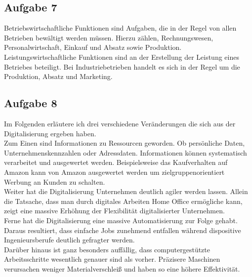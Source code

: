 \documentclass{article}
\begin{document}
	\subsection*{Aufgabe 7}
	Betriebswirtschaftliche Funktionen sind Aufgaben, die in der Regel von allen Betrieben bewältigt werden müssen. Hierzu zählen, Rechnungswesen, Personalwirtschaft, Einkauf und Absatz sowie Produktion. \\
	Leistungswirtschaftliche Funktionen sind an der Erstellung der Leistung eines Betriebes beteiligt. Bei Industriebetrieben handelt es sich in der Regel um die Produktion, Absatz und Marketing.
	
	\subsection*{Aufgabe 8}
	Im Folgenden erläutere ich drei verschiedene Veränderungen die sich aus der Digitalisierung ergeben haben. \\
	Zum Einen sind Informationen zu Ressourcen geworden. Ob persönliche Daten, Unternehmenskennzahlen oder Adressdaten. Informationen können systematisch verarbeitet und ausgewertet werden. Beispielsweise das Kaufverhalten auf Amazon kann von Amazon ausgewertet werden um zielgruppenorientiert Werbung an Kunden zu schalten. \\
	Weiter hat die Digitalisierung Unternehmen deutlich agiler werden lassen. Allein die Tatsache, dass man durch digitales Arbeiten Home Office ermögliche kann, zeigt eine massive Erhöhung der Flexibilität digitalisierter Unternehmen. \\
	Ferne hat die Digitalisierung eine massive Automatisierung zur Folge gehabt. Daraus resultiert, dass einfache Jobs zunehmend entfallen während dispositive Ingenieursberufe deutlich gefragter werden. \\
	Darüber hinaus ist ganz besonders auffällig, dass computergestützte Arbeitsschritte wesentlich genauer sind als vorher. Präzisere Maschinen verursachen weniger Materialverschleiß und haben so eine höhere Effektivität.
\end{document}
